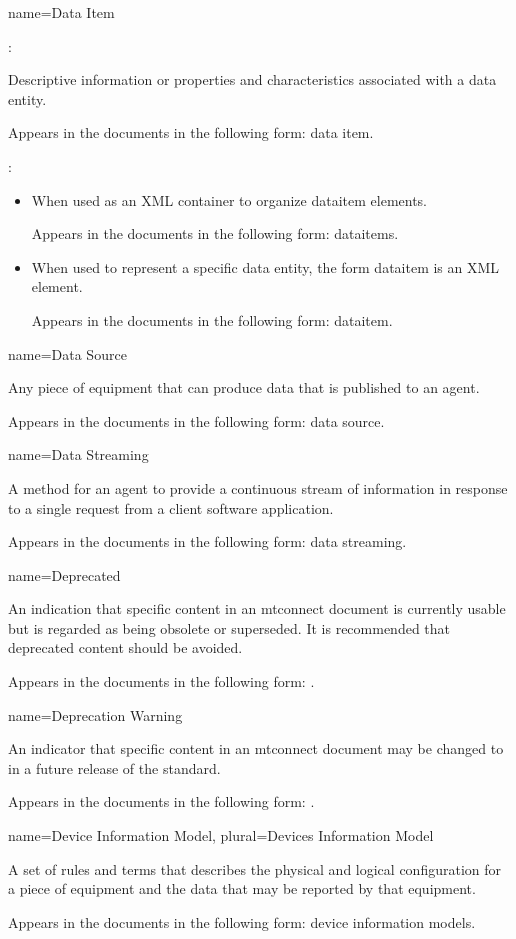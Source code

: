 {
  name={Data Item}
}
{
	:

	Descriptive information or properties and characteristics associated with a \gls{data entity}.

	Appears in the documents in the following form: data item.

	:

    \begin{itemize}
	\item When used as an XML container to organize \gls{dataitem} elements.

	Appears in the documents in the following form: \gls{dataitems}.

	\item When used to represent a specific \gls{data entity}, the form \gls{dataitem} is an XML element.  

	Appears in the documents in the following form: \gls{dataitem}.
    \end{itemize}
}


{
  name={Data Source}
}
{
	Any piece of equipment that can produce data that is published to an \gls{agent}.

	Appears in the documents in the following form: data source.
}


{
  name={Data Streaming}
}
{
	A method for an \gls{agent} to provide a continuous stream of information in response to a single \gls{request} from a client software application.

	Appears in the documents in the following form: \gls{data streaming}.
}


{
  name={Deprecated}
}
{
	An indication that specific content in an \gls{mtconnect document} is currently usable but is regarded as being obsolete or superseded. It is recommended that deprecated content should be avoided.

	Appears in the documents in the following form: \DEPRECATED.
}


{
  name={Deprecation Warning}
}
{
	An indicator that specific content in an \gls{mtconnect document} may be changed to \DEPRECATED in a future release of the standard.

	Appears in the documents in the following form: \DEPRECATIONWARNING.
}


{
  name={Device Information Model},
  plural={Devices Information Model}
}
{
	A set of rules and terms that describes the physical and logical configuration for a piece of equipment and the data that may be reported by that equipment.    

	Appears in the documents in the following form: \glspl{device information model}.
}


